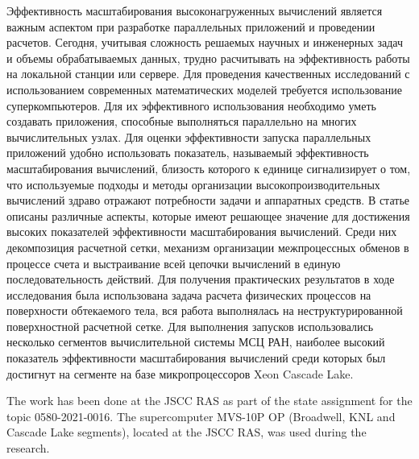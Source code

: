\documentclass[
11pt,%
tightenlines,%
twoside,%
onecolumn,%
nofloats,%
nobibnotes,%
nofootinbib,%
superscriptaddress,%
noshowpacs,%
centertags]%
{revtex4}
\begin{document}
Эффективность масштабирования высоконагруженных вычислений является важным аспектом при разработке параллельных приложений и проведении расчетов.
Сегодня, учитывая сложность решаемых научных и инженерных задач и объемы обрабатываемых данных, трудно расчитывать на эффективность работы на локальной станции или сервере.
Для проведения качественных исследований с использованием современных математических моделей требуется использование суперкомпьютеров.
Для их эффективного использования необходимо уметь создавать приложения, способные выполняться параллельно на многих вычислительных узлах.
Для оценки эффективности запуска параллельных приложений удобно использовать показатель, называемый эффективность масштабирования вычислений, близость которого к единице сигнализирует о том, что используемые подходы и методы организации высокопроизводительных вычислений здраво отражают потребности задачи и аппаратных средств.
В статье описаны различные аспекты, которые имеют решающее значение для достижения высоких показателей эффективности масштабирования вычислений.
Среди них декомпозиция расчетной сетки, механизм организации межпроцессных обменов в процессе счета и выстраивание всей цепочки вычислений в единую последовательность действий.
Для получения практических результатов в ходе исследования была использована задача расчета физических процессов на поверхности обтекаемого тела, вся работа выполнялась на неструктурированной поверхностной расчетной сетке.
Для выполнения запусков использовались несколько сегментов вычислительной системы МСЦ РАН, наиболее высокий показатель эффективности масштабирования вычислений среди которых был достигнут на сегменте на базе микропроцессоров Xeon Cascade Lake.

\begin{acknowledgments}
The work has been done at the JSCC RAS as part of the state assignment for the topic 0580-2021-0016.
The supercomputer MVS-10P OP (Broadwell, KNL and Cascade Lake segments), located at the JSCC RAS, was used during the research.
\end{acknowledgments}
\end{document}
